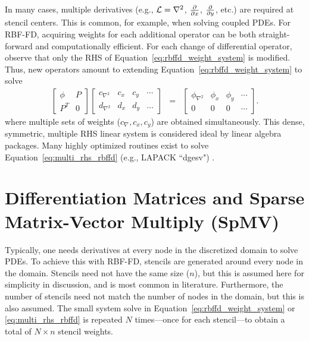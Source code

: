 \documentclass[11pt]{report}
\begin{document}
{In many cases, multiple derivatives (e.g., $\mathcal{L} = \nabla^2$, $\frac{\partial }{\partial x}$, $\frac{\partial }{\partial y}$, etc.) are required at stencil centers. This is common, for example, when solving coupled PDEs. For RBF-FD, acquiring weights for each additional operator can be both straight-forward and computationally efficient. For each change of differential operator, observe that only the RHS of Equation~\ref{eq:rbffd_weight_system} is modified. Thus, new operators amount to extending Equation~\ref{eq:rbffd_weight_system} to solve 
\begin{eqnarray}
    \begin{bmatrix} \phi & P \\
		P^T & 0 \end{bmatrix} \begin{bmatrix} c_{\nabla^2} & c_{x} & c_{y} & \cdots \\ 
							d_{\nabla^2} & d_{x} & d_{y} & \dots \end{bmatrix} & = &     
		\begin{bmatrix} \phi_{\nabla^2} & \phi_{x} & \phi_{y} & \cdots \\
							0 & 0 & 0 & \cdots \end{bmatrix}. \label{eq:multi_rhs_rbffd}
	\end{eqnarray}
where multiple sets of weights ($c_\nabla, c_x, c_y$) are obtained simultaneously. This dense, symmetric, multiple RHS linear system is considered ideal by linear algebra packages. Many highly optimized routines exist to solve Equation~\ref{eq:multi_rhs_rbffd} (e.g., LAPACK ``dgesv") \cite{Lapack1999}. 



\section{Differentiation Matrices and Sparse Matrix-Vector Multiply (SpMV)}


Typically, one needs derivatives at every node in the discretized domain to solve PDEs. To achieve this with RBF-FD, stencils are generated around every node in the domain. Stencils need not have the same size ($n$), but this is assumed here for simplicity in discussion, and is most common in literature. Furthermore, the number of stencils need not match the number of nodes in the domain, but this is also assumed. The small system solve in Equation~\ref{eq:rbffd_weight_system} or \ref{eq:multi_rhs_rbffd}  is repeated $N$ times---once for each stencil---to obtain a total of $N \times n$ stencil weights. 

}
\end{document}
